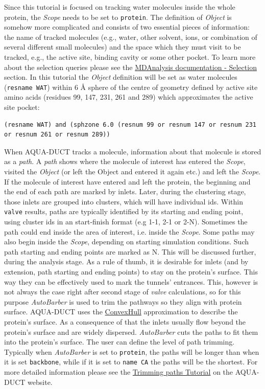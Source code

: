 \documentclass[9pt,tutorial]{livecoms}
\begin{document}
Since this tutorial is focused on tracking water molecules inside the whole protein, the \textit{Scope} needs to be set to \texttt{protein}. The  definition  of \textit{Object} is somehow more complicated and consists of two essential pieces of information: the name of tracked molecules (e.g., water, other solvent, ions, or combination of several different small molecules) and the space which they must visit to be tracked, e.g., the active site, binding cavity or some other pocket. To learn more about the selection queries please see the \href{https://www.mdanalysis.org/docs/documentation_pages/selections.html}{MDAnalysis documentation - Selection} section. In this tutorial the \emph{Object} definition will be set as water molecules (\texttt{resname WAT}) within 6 Å sphere of the centre of geometry defined by active site amino acids (residues 99, 147, 231, 261 and 289) which approximates the active site pocket:
\begin{lstlisting}
(resname WAT) and (sphzone 6.0 (resnum 99 or resnum 147 or resnum 231 or resnum 261 or resnum 289))
\end{lstlisting}

When AQUA-DUCT tracks a molecule, information about that molecule is stored as a \emph{path}. A \emph{path} shows where the molecule of interest has entered the \emph{Scope}, visited the \emph{Object} (or left the Object and entered it again etc.) and left the \emph{Scope}. If the molecule of interest have entered and left the protein, the beginning and the end of each path are marked by inlets. Later, during the clustering stage, those inlets are grouped into clusters, which will have individual ids. Within \texttt{valve} results, paths are typically identified by its starting and ending point, using cluster ids in an start-finish format (e.g 1-1, 2-1 or 2-N). Sometimes the path could end inside the area of interest, i.e. inside the \emph{Scope}. Some paths may also begin inside the \emph{Scope}, depending on starting simulation conditions. Such path starting and ending points are marked as N. This will be discussed further, during the analysis stage. As a rule of thumb, it is desirable for inlets (and by extension, path starting and ending points) to stay on the protein’s surface. This way they can be effectively used to mark the tunnels’ entrances. This, however is not always the case right after second stage of \emph{valve} calculations, so for this purpose \emph{AutoBarber} is used to trim the pathways so they align with protein surface. AQUA-DUCT uses the \href{https://tunneling-group.github.io/aqua-duct/valve/valve_manual.html?highlight=paths#convex-hulls-of-macromolecule-atoms}{ConvexHull} approximation to describe the protein’s surface. As a consequence of that the inlets usually flow beyond the protein’s surface and are widely dispersed. \emph{AutoBarber} cuts the paths to fit them into the protein’s surface. The user can define the level of path trimming. Typically when \textit{AutoBarber} is set to \texttt{protein}, the paths will be longer than when it is set \texttt{backbone}, while if it is set to \texttt{name CA} the paths will be the shortest. For more detailed information please see the \href{http://www.aquaduct.pl/trimming-paths/}{Trimming paths Tutorial} on the AQUA-DUCT website.
\end{document}
